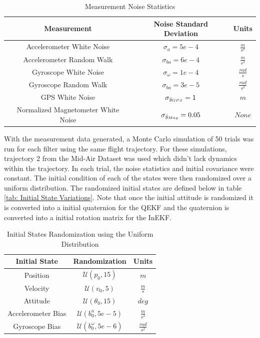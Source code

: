 
\begin{table}[h!]
\centering
\begin{tabular}{|c|c|c|}
\hline
\textbf{Measurement}& \textbf{Noise Standard Deviation} & \textbf{Units} \\ 
\hline
Accelerometer White Noise & $\sigma_{a} = 5e-4$ & $\frac{m}{s^2}$\\ 
\hline
Accelerometer Random Walk & $\sigma_{ba} = 6e-4$ & $\frac{m}{s^3}$\\  
\hline
Gyroscope White Noise & $\sigma_{\omega} = 1e-4$ & $\frac{rad}{s}$\\ 
\hline
Gyroscope Random Walk & $\sigma_{ba} = 3e-5$ & $\frac{rad}{s^2}$ \\ 
\hline
GPS White Noise & $\sigma_{\Tilde{y}_{GPS}} = 1$ & $m$ \\ 
\hline
Normalized Magnetometer White Noise & $\sigma_{\Tilde{y}_{Mag}} = 0.05$ & $None$ \\ 
\hline
\end{tabular}
\caption{Measurement Noise Statistics}
\label{tab: Measurement Noise Statistics}
\end{table}

With the measurement data generated, a Monte Carlo simulation of 50 trials was run for each filter using the same flight trajectory. For these simulations, trajectory 2 from the Mid-Air Dataset was used which didn't lack dynamics within the trajectory. In each trial, the noise statistics and initial covariance were constant. The initial condition of each of the states were then randomized over a uniform distribution. The randomized initial states are defined below in table \eqref{tab: Initial State Variations}. Note that once the initial attitude is randomized it is converted into a initial quaternion for the QEKF and the quaternion is converted into a initial rotation matrix for the InEKF.

\begin{table}[H]
\centering
\begin{tabular}{|c|c|c|}
\hline
\textbf{Initial State} & \textbf{Randomization} & \textbf{Units} \\ 
\hline
Position  & $\mathcal{U}(p_0, 15) $ & $m$ \\ 
\hline
Velocity & $\mathcal{U}(v_0, 5)$ & $\frac{m}{s}$ \\ 
\hline
Attitude & $\mathcal{U}(\theta_0, 15)$ & $deg$\\ 
\hline
Accelerometer Bias & $\mathcal{U}(b^{a}_0, 5e-5)$ & $\frac{m}{s^3}$\\ 
\hline
Gyroscope Bias & $\mathcal{U}(b^{\omega}_0, 5e-6)$ & $\frac{rad}{s^2}$\\ 
\hline
\end{tabular}
\caption{Initial States Randomization using the Uniform Distribution}
\label{tab: Initial State Variations}
\end{table}


